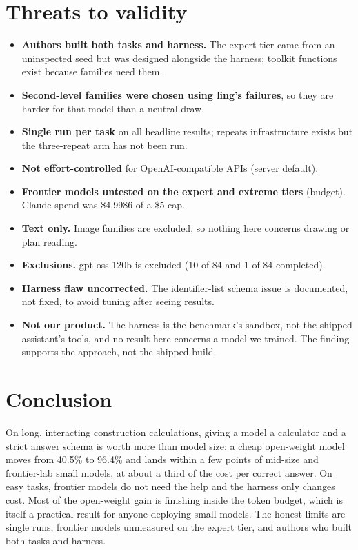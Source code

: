 \documentclass[11pt]{article}
\begin{document}
\section{Threats to validity}
\begin{itemize}
\item \textbf{Authors built both tasks and harness.} The expert tier came from an uninspected seed but was designed alongside the harness; toolkit functions exist because families need them.
\item \textbf{Second-level families were chosen using ling's failures}, so they are harder for that model than a neutral draw.
\item \textbf{Single run per task} on all headline results; repeats infrastructure exists but the three-repeat arm has not been run.
\item \textbf{Not effort-controlled} for OpenAI-compatible APIs (server default).
\item \textbf{Frontier models untested on the expert and extreme tiers} (budget). Claude spend was \$4.9986 of a \$5 cap.
\item \textbf{Text only.} Image families are excluded, so nothing here concerns drawing or plan reading.
\item \textbf{Exclusions.} gpt-oss-120b is excluded (10 of 84 and 1 of 84 completed).
\item \textbf{Harness flaw uncorrected.} The identifier-list schema issue is documented, not fixed, to avoid tuning after seeing results.
\item \textbf{Not our product.} The harness is the benchmark's sandbox, not the shipped assistant's tools, and no result here concerns a model we trained. The finding supports the approach, not the shipped build.
\end{itemize}

\section{Conclusion}
On long, interacting construction calculations, giving a model a calculator and a strict answer schema is worth more than model size: a cheap open-weight model moves from 40.5\% to 96.4\% and lands within a few points of mid-size and frontier-lab small models, at about a third of the cost per correct answer. On easy tasks, frontier models do not need the help and the harness only changes cost. Most of the open-weight gain is finishing inside the token budget, which is itself a practical result for anyone deploying small models. The honest limits are single runs, frontier models unmeasured on the expert tier, and authors who built both tasks and harness.
\end{document}
